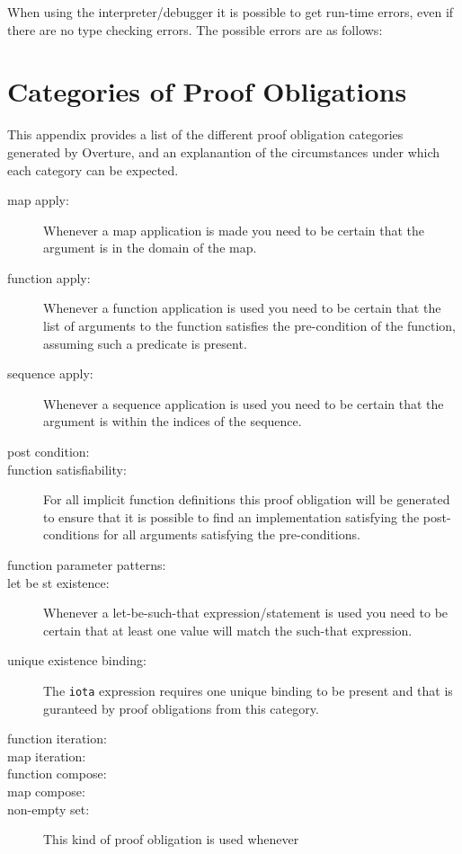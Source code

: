 \documentclass{overturerepchap}
\begin{document}
When using the interpreter/debugger it is possible to get run-time
errors, even if there are no type checking errors. The possible errors
are as follows:



\newpage
\chapter{Categories of Proof Obligations}\label{app:POcategories}

This appendix provides a list of the different proof obligation
categories generated by Overture, and an explanantion of the
circumstances under which each category can be expected.

\begin{description}
\item[map apply:] Whenever a map application is made you need to be
  certain that the argument is in the domain of the map.
\item[function apply:] Whenever a function application is used you need to be
  certain that the list of arguments to the function satisfies the
  pre-condition of the function, assuming such a predicate is present.
\item[sequence apply:] Whenever a sequence application is used you need to be
  certain that the argument is within the indices of the sequence.
\item[post condition:]
\item[function satisfiability:] For all implicit function definitions
  this proof obligation will be generated to ensure that it is
  possible to find an implementation satisfying the post-conditions for all
  arguments satisfying the pre-conditions.
\item[function parameter patterns:]
\item[let be st existence:] Whenever a let-be-such-that
  expression/statement is used you need to be certain that at least one value
  will match the such-that expression.
\item[unique existence binding:] The \texttt{iota} expression
  requires one unique binding to be present and that is guranteed by
  proof obligations from this category.
\item[function iteration:]
\item[map iteration:]
\item[function compose:]
\item[map compose:]
\item[non-empty set:] This kind of proof obligation is used whenever

\end{description}
\end{document}
